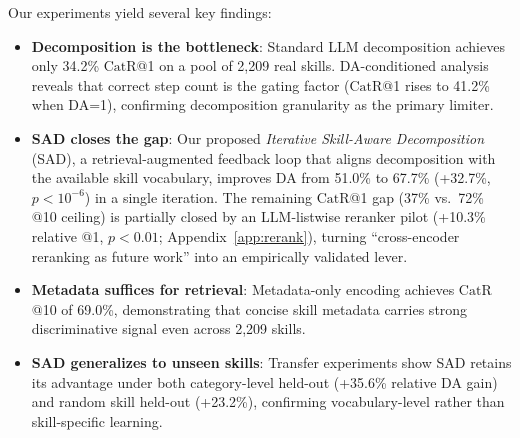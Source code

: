 \documentclass[11pt]{article}
\newcommand{\catrecall}{\text{CatR}}
\begin{document}
Our experiments yield several key findings:
\begin{itemize}[nosep,leftmargin=*]
  \item \textbf{Decomposition is the bottleneck}: Standard LLM decomposition achieves only 34.2\% $\catrecall$@1 on a pool of 2,209 real skills. DA-conditioned analysis reveals that correct step count is the gating factor ($\catrecall$@1 rises to 41.2\% when DA=1), confirming decomposition granularity as the primary limiter.
  \item \textbf{SAD closes the gap}: Our proposed \emph{Iterative Skill-Aware Decomposition} (SAD), a retrieval-augmented feedback loop that aligns decomposition with the available skill vocabulary, improves DA from 51.0\% to 67.7\% (+32.7\%, $p < 10^{-6}$) in a single iteration. The remaining $\catrecall$@1 gap (37\% vs.~72\% @10 ceiling) is partially closed by an LLM-listwise reranker pilot (+10.3\% relative @1, $p{<}0.01$; Appendix~\ref{app:rerank}), turning ``cross-encoder reranking as future work'' into an empirically validated lever.
  \item \textbf{Metadata suffices for retrieval}: Metadata-only encoding achieves $\catrecall$@10 of 69.0\%, demonstrating that concise skill metadata carries strong discriminative signal even across 2,209 skills.
  \item \textbf{SAD generalizes to unseen skills}: Transfer experiments show SAD retains its advantage under both category-level held-out (+35.6\% relative DA gain) and random skill held-out (+23.2\%), confirming vocabulary-level rather than skill-specific learning.
\end{itemize}
\end{document}
